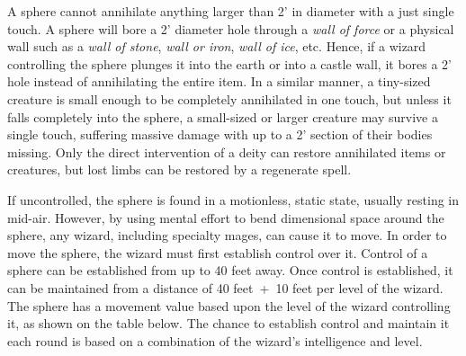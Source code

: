 \begin{multicols}{2}
A sphere cannot annihilate anything larger than 2' in diameter with a just single touch.  A sphere will bore a 2' diameter hole through a \textit{wall of force} or a physical wall such as a \textit{wall of stone}, \textit{wall or iron}, \textit{wall of ice}, etc. Hence, if a wizard controlling the sphere plunges it into the earth or into a castle wall, it bores a 2' hole instead of annihilating the entire item.  In a similar manner, a tiny-sized creature is small enough to be completely annihilated in one touch, but unless it falls completely into the sphere, a small-sized or larger creature may survive a single touch, suffering massive damage with up to a 2' section of their bodies missing.  Only the direct intervention of a deity can restore annihilated items or creatures, but lost limbs can be restored by a regenerate spell.  

If uncontrolled, the sphere is found in a motionless, static state, usually resting in mid-air.  However, by using mental effort to bend dimensional space around the sphere, any wizard, including specialty mages, can cause it to move.  In order to move the sphere, the wizard must first establish control over it.  Control of a sphere can be established from up to 40 feet away.  Once control is established, it can be maintained from a distance of 40 feet~+~10 feet per level of the wizard.  The sphere has a movement value based upon the level of the wizard controlling it, as shown on the table below.  The chance to establish control and maintain it each round is based on a combination of the wizard's intelligence and level. 
 

\end{multicols}
